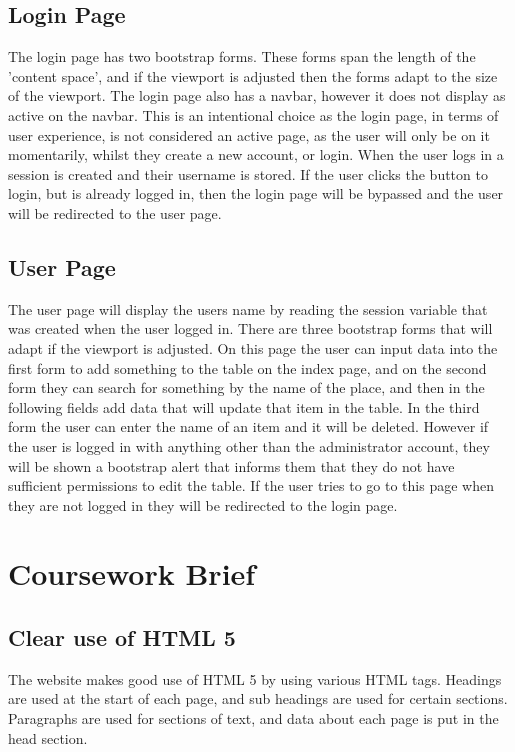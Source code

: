 \documentclass[12pt,a4paper]{article}
\begin{document}
		\subsection{Login Page}
		The login page has two bootstrap forms. These forms span the length of the 'content space', and if the viewport is adjusted then the forms adapt to the size of the viewport. The login page also has a navbar, however it does not display as active on the navbar. This is an intentional choice as the login page, in terms of user experience, is not considered an active page, as the user will only be on it momentarily, whilst they create a new account, or login. When the user logs in a session is created and their username is stored. If the user clicks the button  to login, but is already logged in, then the login page will be bypassed and the user will be redirected to the user page.

		\subsection{User Page}
		The user page will display the users name by reading the session variable that was created when the user logged in. There are three bootstrap forms that will adapt if the viewport is adjusted. On this page the user can input data into the first form to add something to the table on the index page, and on the second form they can search for something by the name of the place, and then in the following fields add data that will update that item in the table. In the third form the user can enter the name of an item and it will be deleted. However if the user is logged in with anything other than the administrator account, they will be shown a bootstrap alert that informs them that they do not have sufficient permissions to edit the table. If the user tries to go to this page when  they are not logged in they will be redirected to the login page.

	\clearpage

	\section{Coursework Brief}
		\subsection{Clear use of HTML 5}
		The website makes good use of HTML 5 by using various HTML tags. Headings are used at the start of each page, and sub headings are used for certain sections. Paragraphs are used for sections of text, and data about each page is put in the head section.
\end{document}
